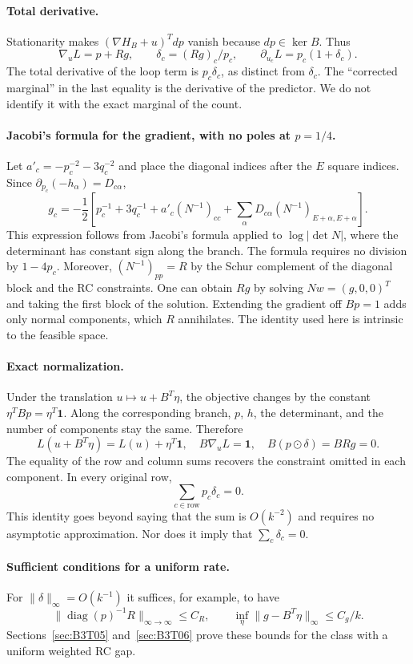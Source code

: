 \paragraph{Total derivative.}
Stationarity makes $(\nabla H_B+u)^Tdp$ vanish because $dp\in\ker B$.
Thus
\[
 \boxed{\nabla_uL=p+Rg},\qquad
 \boxed{\delta_c=(Rg)_c/p_c},\qquad
 \partial_{u_c}L=p_c(1+\delta_c).
\]
The total derivative of the loop term is $p_c\delta_c$, as distinct from $\delta_c$. The “corrected
marginal” in the last equality is the derivative of the predictor. We do not identify it with the exact
marginal of the count.

\paragraph{Jacobi's formula for the gradient, with no poles at $p=1/4$.}
Let $a'_c=-p_c^{-2}-3q_c^{-2}$ and place the diagonal indices after the $E$ square indices. Since
$\partial_{p_c}(-h_\alpha)=D_{c\alpha}$,
\[
 \boxed{g_c=-\frac12\left[
 p_c^{-1}+3q_c^{-1}+a'_c(N^{-1})_{cc}
 +\sum_\alpha D_{c\alpha}(N^{-1})_{E+\alpha,E+\alpha}
 \right].}
\]
This expression follows from Jacobi's formula applied to $\log|\det N|$, where the determinant has constant
sign along the branch. The formula requires no division by $1-4p_c$. Moreover, $(N^{-1})_{pp}=R$ by the
Schur complement of the diagonal block and the RC constraints.
One can obtain $Rg$ by solving $Nw=(g,0,0)^T$ and taking the first block of the solution.
Extending the gradient off $Bp=1$ adds only normal components, which $R$ annihilates. The identity used here
is intrinsic to the feasible space.

\paragraph{Exact normalization.}
Under the translation $u\mapsto u+B^T\eta$, the objective changes by the constant $\eta^TBp=\eta^T\mathbf1$.
Along the corresponding branch, $p$, $h$, the determinant, and the number of components stay the same.
Therefore
\[
 L(u+B^T\eta)=L(u)+\eta^T\mathbf1,
 \quad B\nabla_uL=\mathbf1,
 \quad B(p\odot\delta)=BRg=0.
\]
The equality of the row and column sums recovers the constraint omitted in each component. In every original
row,
\[
 \boxed{\sum_{c\in\mathrm{row}}p_c\delta_c=0.}
\]
This identity goes beyond saying that the sum is $O(k^{-2})$ and requires no asymptotic approximation. Nor
does it imply that $\sum_c\delta_c=0$.

\paragraph{Sufficient conditions for a uniform rate.}
For $\|\delta\|_\infty=O(k^{-1})$ it suffices, for example, to have
\[
 \|\operatorname{diag}(p)^{-1}R\|_{\infty\to\infty}\le C_R,
 \qquad \inf_\eta\|g-B^T\eta\|_\infty\le C_g/k.
\]
Sections~\ref{sec:B3T05} and~\ref{sec:B3T06} prove these bounds for the class with a uniform weighted RC
gap.
